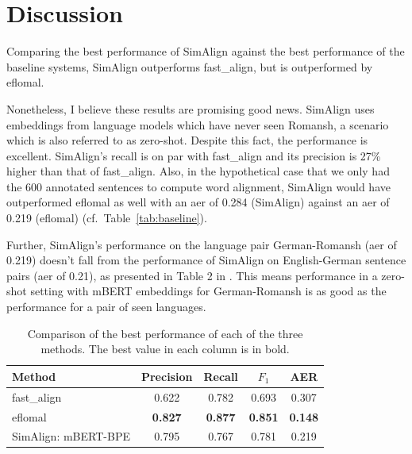 \section{Discussion}
Comparing the best performance of SimAlign against the best performance of the baseline systems, SimAlign outperforms fast\_align, but is outperformed by eflomal.

Nonetheless, I believe these results are promising good news. 
SimAlign uses embeddings from language models which have never seen Romansh, a scenario which is also referred to as zero-shot. 
Despite this fact, the performance is excellent. 
SimAlign's recall is on par with fast\_align and its precision is 27\% higher than that of fast\_align. 
Also, in the hypothetical case that we only had the 600 annotated sentences to compute word alignment, SimAlign would have outperformed eflomal as well with an \acrshort{aer} of 0.284 (SimAlign) against an \acrshort{aer} of 0.219 (eflomal) (cf.~Table~\ref{tab:baseline}). 

Further,  SimAlign's performance on the language pair German-Romansh (\acrshort{aer} of 0.219) doesn't fall from the performance of SimAlign on English-German sentence pairs (\acrshort{aer} of 0.21),  as presented in Table 2 in \cite{jalili-sabet-etal-2020-simalign}. This means performance in a zero-shot setting  with mBERT embeddings  for German-Romansh is as good as the performance for a pair of seen languages.

\begin{table}
\centering
\begin{tabular}{lcccc}
	\toprule
							Method & Precision & Recall & $F_1$ & AER \\
\midrule
  fast\_align& 0.622	  & 0.782  & 0.693 & 0.307 \\

							eflomal     & \textbf{0.827} & \textbf{0.877} & \textbf{0.851} & \textbf{0.148} \\

SimAlign:                     mBERT-BPE & 0.795   & 0.767  & 0.781  & 0.219 \\
\bottomrule
\end{tabular}
\caption[Comparison of the best performance of the three SimAlign methods]{Comparison of the best performance of each of the three methods. 
The best value in each column is in bold.}
\label{tab:comparison}
\end{table}

